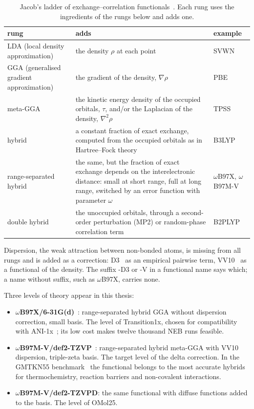 \begin{table}[h]
\centering
\caption{Jacob's ladder of exchange--correlation
functionals~\cite{perdew2001}. Each rung uses the ingredients of the rungs
below and adds one.}
\label{tab:functionals}
\begin{tabular}{@{}l p{7.4cm} l@{}}
\toprule
rung & adds & example \\
\midrule
LDA (local density approximation) & the density $\rho$ at each point & SVWN \\
GGA (generalised gradient approximation) & the gradient of the density, $\nabla\rho$ & PBE \\
meta-GGA & the kinetic energy density of the occupied orbitals, $\tau$,
  and/or the Laplacian of the density, $\nabla^2\rho$ & TPSS \\
hybrid & a constant fraction of exact exchange, computed from the occupied
  orbitals as in Hartree--Fock theory & B3LYP \\
range-separated hybrid & the same, but the fraction of exact exchange
  depends on the interelectronic distance: small at short range, full at
  long range, switched by an error function with parameter $\omega$ &
  $\omega$B97X, $\omega$B97M-V \\
double hybrid & the unoccupied orbitals, through a second-order
  perturbation (MP2) or random-phase correlation term & B2PLYP \\
\bottomrule
\end{tabular}
\end{table}

Dispersion, the weak attraction between non-bonded atoms, is missing from
all rungs and is added as a correction: D3~\cite{grimme2010} as an
empirical pairwise term, VV10~\cite{vydrov2010} as a functional of the
density. The suffix -D3 or -V in a functional name says which; a name
without suffix, such as $\omega$B97X, carries none.

Three levels of theory appear in this thesis:

\begin{itemize}
  \item \textbf{$\omega$B97X/6-31G(d)}~\cite{chai2008}: range-separated
    hybrid GGA without dispersion correction, small basis. The level of
    Transition1x, chosen for compatibility with
    ANI-1x~\cite{schreiner2022}; its low cost makes twelve thousand NEB
    runs feasible.
  \item \textbf{$\omega$B97M-V/def2-TZVP}~\cite{mardirossian2016}:
    range-separated hybrid meta-GGA with VV10 dispersion, triple-zeta
    basis. The target level of the delta correction. In the GMTKN55
    benchmark~\cite{goerigk2017, najibi2018} the functional belongs to the most
    accurate hybrids for thermochemistry, reaction barriers and
    non-covalent interactions.
  \item \textbf{$\omega$B97M-V/def2-TZVPD}: the same functional with
    diffuse functions added to the basis. The level of OMol25.
\end{itemize}


